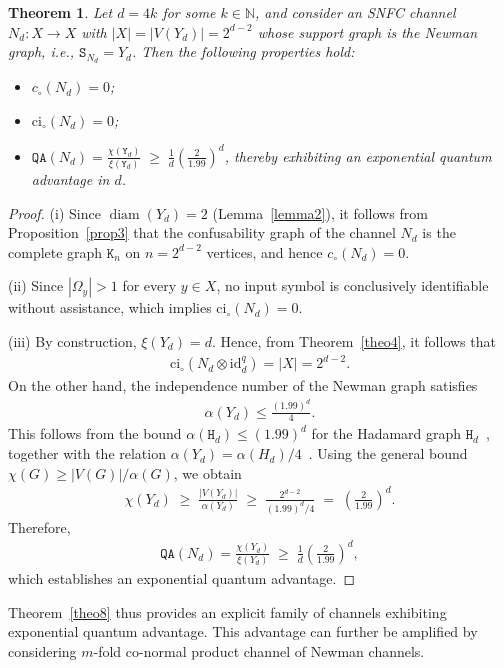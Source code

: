 \documentclass[12pt,a4paper]{article}
\newtheorem{theorem}{Theorem}
\begin{document}
\begin{theorem}
Let $d=4k$ for some $k\in\mathbb{N}$, and consider an SNFC channel $N_d:X\to X$ with $|X|=|V(Y_d)|=2^{d-2}$ whose support graph is the Newman graph, i.e., $\mathtt{S}_{N_d}=Y_d$. Then the following properties hold:
\begin{itemize}[itemsep=-0.15cm, parsep=0.15cm, topsep=2pt, leftmargin=1.0cm]
\item[\emph{(i)}] $c_\circ(N_d)=0$;
\item[\emph{(ii)}] $\mathrm{ci}_\circ(N_d)=0$;
\item[\emph{(iii)}] $\mathtt{QA}(N_d)=\frac{\chi(\mathtt{Y}_d)}{\xi(\mathtt{Y}_d)} \;\ge\; \frac{1}{d}\left(\frac{2}{1.99}\right)^d$, thereby exhibiting an exponential quantum advantage in $d$.
\end{itemize}
\end{theorem}
\begin{proof}
(i) Since $\operatorname{diam}(Y_d)=2$ (Lemma~\ref{lemma2}), it follows from Proposition~\ref{prop3} that the confusability graph of the channel $N_d$ is the complete graph $\mathtt{K}_n$ on $n=2^{d-2}$ vertices, and hence $c_\circ(N_d)=0$.

\noindent (ii) Since $|\Omega_y|>1$ for every $y\in X$, no input symbol is conclusively identifiable without assistance, which implies $\mathrm{ci}_\circ(N_d)=0$.

\noindent (iii) By construction, $\xi(Y_d)=d$. Hence, from Theorem~\ref{theo4}, it follows that
\begin{align*}
\mathrm{ci}_\circ\!\left(N_d\otimes \mathrm{id}^q_d\right)=|X|=2^{d-2}.    
\end{align*}
On the other hand, the independence number of the Newman graph satisfies
\begin{align*}
\alpha(Y_d)\le \frac{(1.99)^d}{4}.
\end{align*}
This follows from the bound $\alpha(\mathtt{H}_d)\le (1.99)^d$ for the Hadamard graph $\mathtt{H}_d$~\cite{Frankl1987}, together with the relation $\alpha(Y_d)=\alpha(H_d)/4$~\cite{Newman}. Using the general bound $\chi(G)\ge |V(G)|/\alpha(G)$, we obtain
\begin{align*}
\chi(Y_d)\;\ge\;\frac{|V(Y_d)|}{\alpha(Y_d)}
\;\ge\;\frac{2^{d-2}}{(1.99)^d/4}
\;=\;\left(\frac{2}{1.99}\right)^d.
\end{align*}
Therefore,
\begin{align*}
\mathtt{QA}(N_d)=\frac{\chi(Y_d)}{\xi(Y_d)}
\;\ge\;\frac{1}{d}\left(\frac{2}{1.99}\right)^d,
\end{align*}
which establishes an exponential quantum advantage.
\end{proof}
Theorem~\ref{theo8} thus provides an explicit family of channels exhibiting exponential quantum advantage. This advantage can further be amplified by considering $m$-fold co-normal product channel of Newman channels. 
\end{document}
